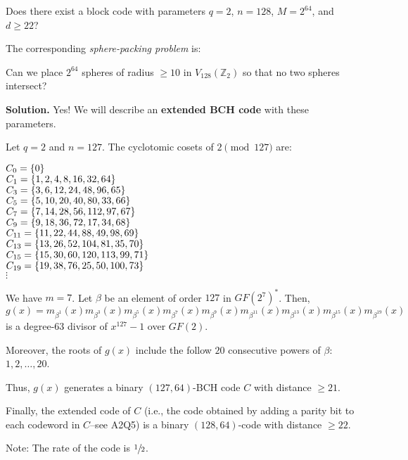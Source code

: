 \begin{Example}{}{}
    Does there exist a block code with parameters
    $ q=2 $, $ n=128 $, $ M=2^{64} $, and $ d\geqslant 22 $?

    The corresponding \emph{sphere-packing problem} is:

    Can we place $ 2^{64} $ spheres of radius
    $ \geqslant 10 $ in $ V_{128}(\mathbb{Z}_2) $
    so that no two spheres intersect?

    \textbf{Solution.} Yes! We will describe an
    \textbf{extended BCH code} with these parameters.

    Let $ q=2 $ and $ n=127 $. The cyclotomic cosets
    of $ 2\pmod{127} $ are:

    \begin{center}
        \begin{multicols}{2}
            $ C_0=\{0\} $\\
            $ C_1=\{1,2,4,8,16,32,64\} $\\
            $ C_3=\{3,6,12,24,48,96,65\} $\\
            $ C_5=\{5,10,20,40,80,33,66\} $\\
            $ C_7=\{7,14,28,56,112,97,67\} $\\
            $ C_9=\{9,18,36,72,17,34,68\} $\\
            $ C_{11}=\{11,22,44,88,49,98,69\} $\\
            $ C_{13}=\{13,26,52,104,81,35,70\} $\\
            $ C_{15}=\{15,30,60,120,113,99,71\} $\\
            $ C_{19}=\{19,38,76,25,50,100,73\} $\\
            $ \vdots $
        \end{multicols}
    \end{center}

    We have $ m=7 $. Let $ \beta $ be an element of order $ 127 $
    in $ GF(2^7)^* $. Then,
    \[ g(x)=m_{\beta^1}(x)m_{\beta^3}(x)m_{\beta^5}(x)m_{\beta^7}(x)
        m_{\beta^9}(x)m_{\beta^{11}}(x)m_{\beta^{13}}(x)
        m_{\beta^{15}}(x)m_{\beta^{19}}(x) \]
    is a degree-$ 63 $ divisor of $ x^{127}-1 $ over $ GF(2) $.

    Moreover, the roots of $ g(x) $ include the follow $ 20 $
    consecutive powers of $ \beta $: $ 1,2,\ldots ,20 $.

    Thus, $ g(x) $ generates a binary $ (127,64) $-BCH code
    $ C $ with distance $ \geqslant 21 $.

    Finally, the extended code of $ C $ (i.e., the code obtained
    by adding a parity bit to each codeword in $ C $--see A2Q5) is
    a binary $ (128,64) $-code with distance $ \geqslant 22 $.

    Note: The rate of the code is $ \sfrac{1}{2} $.
\end{Example}

